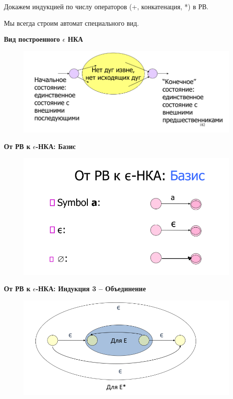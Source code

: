 \documentclass{article}
\begin{document}
Докажем индукцией по числу операторов
(+, конкатенация, *) в РВ.

Мы всегда строим автомат специального вид.

\textbf{Вид построенного $\epsilon$ НКА}

\begin{figure}[H]
    \centering
    \includegraphics[width=1\linewidth]{Снимок экрана 2025-03-20 085148.png}
\end{figure}


\textbf{От РВ к $\epsilon$-НКА: Базис}

\begin{figure}[H]
    \centering
    \includegraphics[width=1\linewidth]{Снимок экрана 2025-03-20 085218.png}
\end{figure}

\textbf{От РВ к $\epsilon$-НКА: Индукция 3 – Объединение}

\begin{figure}[H]
    \centering
    \includegraphics[width=1\linewidth]{Снимок экрана 2025-03-20 085605.png}
\end{figure}
\end{document}
